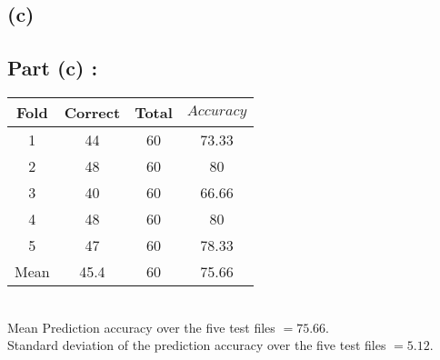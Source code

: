 \documentclass[11pt]{article} %
\begin{document}
\subsection*{(c)}
\subsection*{Part (c) : }

\begin{tabular}{|c|c|c|c|}\hline
Fold & Correct & Total & $Accuracy $  \\ \hline
1 & 44 & 60 & 73.33 \\ \hline
2 & 48 & 60 & 80 \\ \hline
3 & 40 & 60 & 66.66 \\ \hline
4 & 48 & 60 & 80 \\ \hline
5 & 47 & 60 & 78.33\\ \hline
Mean & 45.4 & 60 & 75.66 \\\hline
\end{tabular}
\vspace{1em} \\
Mean Prediction accuracy over the five test files $=75.66$. \\
Standard deviation of the prediction accuracy over the five test files $=5.12$.
\end{document}

